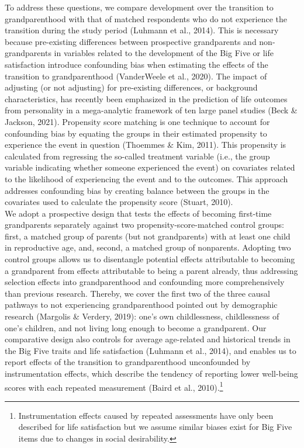 \documentclass[
  english,
  man, noextraspace]{apa7}
\begin{document}
To address these questions, we compare development over the transition to grandparenthood with that of matched respondents who do not experience the transition during the study period (Luhmann et al., 2014). This is necessary because pre-existing differences between prospective grandparents and non-grandparents in variables related to the development of the Big Five or life satisfaction introduce confounding bias when estimating the effects of the transition to grandparenthood (VanderWeele et al., 2020). The impact of adjusting (or not adjusting) for pre-existing differences, or background characteristics, has recently been emphasized in the prediction of life outcomes from personality in a mega-analytic framework of ten large panel studies (Beck \& Jackson, 2021). Propensity score matching is one technique to account for confounding bias by equating the groups in their estimated propensity to experience the event in question (Thoemmes \& Kim, 2011). This propensity is calculated from regressing the so-called treatment variable (i.e., the group variable indicating whether someone experienced the event) on covariates related to the likelihood of experiencing the event and to the outcomes. This approach addresses confounding bias by creating balance between the groups in the covariates used to calculate the propensity score (Stuart, 2010).\\
We adopt a prospective design that tests the effects of becoming first-time grandparents separately against two propensity-score-matched control groups: first, a matched group of parents (but not grandparents) with at least one child in reproductive age, and, second, a matched group of nonparents. Adopting two control groups allows us to disentangle potential effects attributable to becoming a grandparent from effects attributable to being a parent already, thus addressing selection effects into grandparenthood and confounding more comprehensively than previous research. Thereby, we cover the first two of the three causal pathways to not experiencing grandparenthood pointed out by demographic research (Margolis \& Verdery, 2019): one's own childlessness, childlessness of one's children, and not living long enough to become a grandparent. Our comparative design also controls for average age-related and historical trends in the Big Five traits and life satisfaction (Luhmann et al., 2014), and enables us to report effects of the transition to grandparenthood unconfounded by instrumentation effects, which describe the tendency of reporting lower well-being scores with each repeated measurement (Baird et al., 2010).\footnote{Instrumentation effects caused by repeated assessments have only been described for life satisfaction but we assume similar biases exist for Big Five items due to changes in social desirability.}\\
\end{document}
